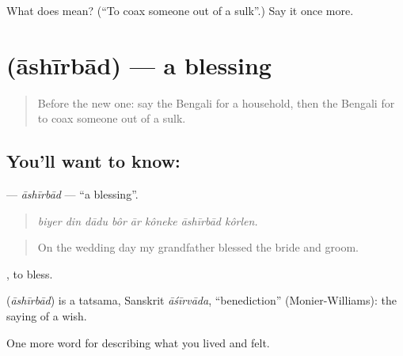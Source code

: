 \begin{tcolorbox}[breakable,colback=teal!4,colframe=teal!35!black,title={Before you move on}]
What does   mean? (\textquotedblleft{}To coax someone out of a sulk\textquotedblright{}.) Say it once more.
\end{tcolorbox}
\section[\texorpdfstring{\bn{আশীর্বাদ} (āshīrbād)}{আশীর্বাদ (āshīrbād)}]{ (āshīrbād) — a blessing}

\label{lesson:BN-C489-ashirbad}



\begin{quote}
Before the new one: say the Bengali for a household, then the Bengali for to coax someone out of a sulk.
\end{quote}

\subsection*{You'll want to know: }
\textbf{} — \emph{āshīrbād} — \textquotedblleft{}a blessing\textquotedblright{}.

\begin{quote}
       
\end{quote}

\begin{quote}
\emph{biyer din dādu bôr ār kôneke āshīrbād kôrlen.}
\end{quote}

\begin{quote}
On the wedding day my grandfather blessed the bride and groom.
\end{quote}

 , to bless.

\begin{cousinweb}
\textbf{} (\emph{āshīrbād}) is a tatsama, Sanskrit \emph{āśīrvāda}, \textquotedblleft{}benediction\textquotedblright{} (Monier-Williams): the saying of a wish.
\end{cousinweb}

\begin{grammarlens}[title={What you've built}]
One more word for describing what you lived and felt.
\end{grammarlens}

